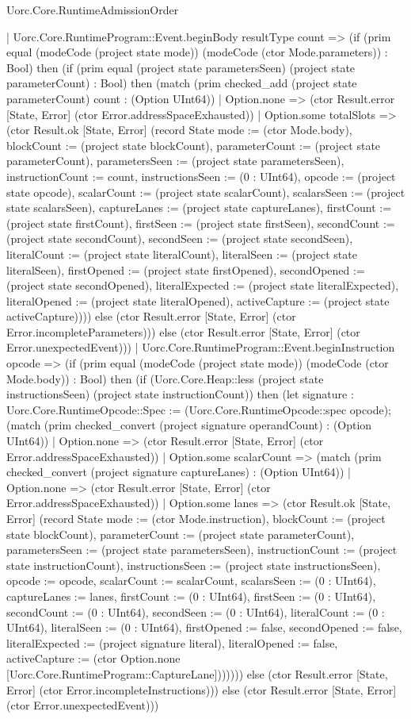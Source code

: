\begin{lexlean}{Uorc.Core.RuntimeAdmissionOrder}
\begin{semanticmodule}
{    | Uorc.Core.RuntimeProgram::Event.beginBody resultType count => (if (prim equal (modeCode (project state mode)) (modeCode (ctor Mode.parameters)) : Bool) then (if (prim equal (project state parametersSeen) (project state parameterCount) : Bool) then (match (prim checked_add (project state parameterCount) count : (Option UInt64))
      | Option.none => (ctor Result.error [State, Error] (ctor Error.addressSpaceExhausted))
      | Option.some totalSlots => (ctor Result.ok [State, Error] (record State {mode := (ctor Mode.body), blockCount := (project state blockCount), parameterCount := (project state parameterCount), parametersSeen := (project state parametersSeen), instructionCount := count, instructionsSeen := (0 : UInt64), opcode := (project state opcode), scalarCount := (project state scalarCount), scalarsSeen := (project state scalarsSeen), captureLanes := (project state captureLanes), firstCount := (project state firstCount), firstSeen := (project state firstSeen), secondCount := (project state secondCount), secondSeen := (project state secondSeen), literalCount := (project state literalCount), literalSeen := (project state literalSeen), firstOpened := (project state firstOpened), secondOpened := (project state secondOpened), literalExpected := (project state literalExpected), literalOpened := (project state literalOpened), activeCapture := (project state activeCapture)}))) else (ctor Result.error [State, Error] (ctor Error.incompleteParameters))) else (ctor Result.error [State, Error] (ctor Error.unexpectedEvent)))
    | Uorc.Core.RuntimeProgram::Event.beginInstruction opcode => (if (prim equal (modeCode (project state mode)) (modeCode (ctor Mode.body)) : Bool) then (if (Uorc.Core.Heap::less (project state instructionsSeen) (project state instructionCount)) then (let signature : Uorc.Core.RuntimeOpcode::Spec := (Uorc.Core.RuntimeOpcode::spec opcode); (match (prim checked_convert (project signature operandCount) : (Option UInt64))
      | Option.none => (ctor Result.error [State, Error] (ctor Error.addressSpaceExhausted))
      | Option.some scalarCount => (match (prim checked_convert (project signature captureLanes) : (Option UInt64))
        | Option.none => (ctor Result.error [State, Error] (ctor Error.addressSpaceExhausted))
        | Option.some lanes => (ctor Result.ok [State, Error] (record State {mode := (ctor Mode.instruction), blockCount := (project state blockCount), parameterCount := (project state parameterCount), parametersSeen := (project state parametersSeen), instructionCount := (project state instructionCount), instructionsSeen := (project state instructionsSeen), opcode := opcode, scalarCount := scalarCount, scalarsSeen := (0 : UInt64), captureLanes := lanes, firstCount := (0 : UInt64), firstSeen := (0 : UInt64), secondCount := (0 : UInt64), secondSeen := (0 : UInt64), literalCount := (0 : UInt64), literalSeen := (0 : UInt64), firstOpened := false, secondOpened := false, literalExpected := (project signature literal), literalOpened := false, activeCapture := (ctor Option.none [Uorc.Core.RuntimeProgram::CaptureLane])}))))) else (ctor Result.error [State, Error] (ctor Error.incompleteInstructions))) else (ctor Result.error [State, Error] (ctor Error.unexpectedEvent)))
}
\end{semanticmodule}
\end{lexlean}
